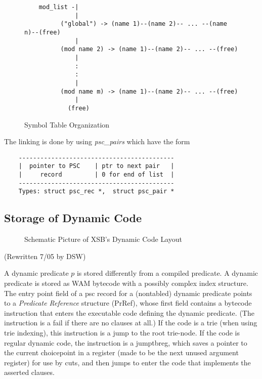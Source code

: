 \documentclass[11pt]{article}
\begin{document}
\begin{figure}
\begin{verbatim}
    mod_list -|
              |
          ("global") -> (name 1)--(name 2)-- ... --(name n)--(free)
              |
          (mod name 2) -> (name 1)--(name 2)-- ... --(free)
              |
              :
              :
              |
          (mod name m) -> (name 1)--(name 2)-- ... --(free)
              |
            (free)
\end{verbatim}
\caption{Symbol Table Organization}
\label{f:pscinmem}
\end{figure}

The linking is done by using {\it psc\_pairs} which have the form

\begin{verbatim}
    -------------------------------------------
    |  pointer to PSC    | ptr to next pair   |
    |     record         | 0 for end of list  |
    -------------------------------------------
    Types: struct psc_rec *,  struct psc_pair *
\end{verbatim}


\subsection{Storage of Dynamic Code}

\begin{figure}[htbp]
\caption{Schematic Picture of XSB's Dynamic Code Layout}
\label{fig:dynamic-code}
\end{figure}

(Rewritten 7/05 by DSW)

A dynamic predicate $p$ is stored differently from a compiled
predicate.  A dynamic predicate is stored as WAM bytecode with a
possibly complex index structure.  The entry point field of a psc
record for a (nontabled) dynamic predicate points to a {\em Predicate
Reference} structure (PrRef), whose first field contains a bytecode
instruction that enters the executable code defining the dynamic
predicate.  (The instruction is a fail if there are no clauses at
all.)  If the code is a trie (when using trie indexing), this
instruction is a jump to the root trie-node.  If the code is regular
dynamic code, the instruction is a jumptbreg, which saves a pointer to
the current choicepoint in a register (made to be the next unused
argument register) for use by cuts, and then jumps to enter the code
that implements the asserted clauses.
\end{document}
